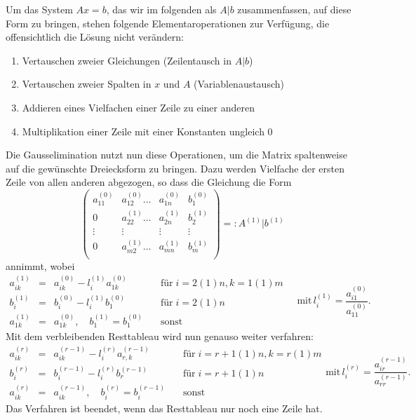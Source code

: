 Um das System $Ax=b$, das wir im folgenden als $A|b$ zusammenfassen,
auf diese Form zu bringen, stehen folgende Elementaroperationen zur
Verfügung, die offensichtlich die Lösung nicht verändern:
\begin{enumerate}
\item Vertauschen zweier Gleichungen (Zeilentausch in $A|b$)
\item Vertauschen zweier Spalten in $x$ und $A$ (Variablenaustausch)
\item Addieren eines Vielfachen einer Zeile zu einer anderen
\item Multiplikation einer Zeile mit einer Konstanten ungleich 0
\end{enumerate}
Die Gausselimination nutzt nun diese Operationen, um die Matrix
spaltenweise auf die gewünschte Dreiecksform zu bringen. Dazu werden
Vielfache der ersten Zeile von allen anderen abgezogen, so dass die
Gleichung die Form
\begin{equation}
  \left(\begin{array}{lll|c}
      a_{11}^{(0)} & a_{12}^{(0)}\ldots &a_{1n}^{(0)} & b_1^{(0)}\\
      0     & a_{22}^{(1)}\ldots &a_{2n}^{(1)} & b_2^{(1)}\\
      \vdots& \vdots      &\vdots& \vdots\\
      0     & a_{m2}^{(1)}\ldots &a_{mn}^{(1)} & b_m^{(1)}\\
    \end{array}\right) =: A^{(1)} | b^{(1)}
\end{equation}
annimmt, wobei
\begin{equation}
  \begin{array}{rcll}
    a_{ik}^{(1)} &=& a_{ik}^{(0)} -  l_{i}^{(1)}a_{1k}^{(0)}
    & \quad\text{für}\; i=2(1)n, k=1(1)m\\[0.3em]
    b_{i}^{(1)} &=& b_{i}^{(0)} - l_{i}^{(1)} b_{1}^{(0)}
    & \quad\text{für}\; i=2(1)n \\[0.3em]
    a_{1k}^{(1)} &=& a_{1k}^{(0)},\quad b_{1}^{(1)} = b_{1}^{(0)}
    & \quad\text{sonst}
  \end{array}
  \quad\text{mit}\, l_{i}^{(1)} = \frac{a_{i1}^{(0)}}{a_{11}^{(0)}}.
\end{equation}
Mit dem verbleibenden Resttableau wird nun
genauso weiter verfahren:
\begin{equation}
  \label{eq:gausseli}
  \begin{array}{rcll}
    a_{ik}^{(r)} &=& a_{ik}^{(r-1)} -  l_{i}^{(r)}a_{r,k}^{(r-1)}
    & \quad\text{für}\; i=r+1(1)n, k=r(1)m\\[0.3em]
    b_{i}^{(r)} &=& b_{i}^{(r-1)} - l_{i}^{(r)} b_{r}^{(r-1)}
    & \quad\text{für}\; i=r+1(1)n \\[0.3em]
    a_{ik}^{(r)} &=& a_{ik}^{(r-1)},\quad b_{i}^{(r)} = b_{i}^{(r-1)}
    & \quad\text{sonst}
  \end{array}
  \text{mit}\, l_{i}^{(r)} = \frac{a_{ir}^{(r-1)}}{a_{rr}^{(r-1)}}.
\end{equation}
Das Verfahren ist beendet, wenn das Resttableau nur noch eine Zeile hat.


